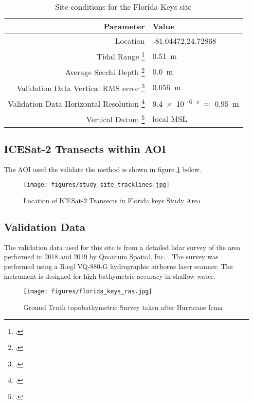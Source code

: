 \begin{table}[h!]
    \begin{minipage}{0.5\textwidth}
        \centering\begin{tabular}{r l }
            Parameter                                                      & \textbf{Value}                                 \\
            \hline
            Location                                                       & -81.04472,24.72868                             \\
            Tidal Range \footcite{tidal_data_reanalysis2022}               & \qty{0.51}{m}                                  \\
            Average Secchi Depth \footcite{ACRI-STGlobColourTeam2020}      & \qty{0.0}{m}                                   \\
            Validation Data Vertical RMS error \footcite{Keys2019Lidar}    & \qty{0.056}{m}                                 \\
            Validation Data Horizontal Resolution \footcite{Keys2019Lidar} & \qty{9.4e-6}{ \degree} $\approx$ \qty{0.95}{m} \\
            Vertical Datum \footcite{Keys2019Lidar}                        & local MSL                                      \\
        \end{tabular}
    \end{minipage}
    \caption{Site conditions for the Florida Keys site}
    \label{table:floridasitestats}
\end{table}


\subsection{ICESat-2 Transects within AOI}
The AOI used the validate the method is shown in figure \ref{fig:keys_transects} below.
\begin{figure}[h!]
    \centering
    \texttt{[image: figures/study\_site\_tracklines.jpg]}
    \caption{Location of ICESat-2 Transects in Florida keys Study Area}
    \label{fig:keys_transects}
\end{figure}
\subsection{Validation Data}
The validation data used for this site is from a detailed lidar survey of the area performed in 2018 and 2019 by Quantum Spatial, Inc. \parencite{Keys2019Lidar}. The survey was performed using a Riegl VQ-880-G hydrographic airborne laser scanner. The instrument is designed for high bathymetric accuracy in shallow water.
\begin{figure}[h!]
    \centering
    \texttt{[image: figures/florida\_keys\_ras.jpg]}
    \caption{Ground Truth topobathymetric Survey taken after Hurricane Irma}
    \label{fig:truebathy}
\end{figure}
